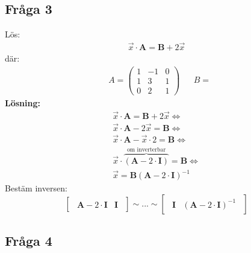 \subsection{Fråga 3}
Lös:
\begin{gather*}
    \vec{x} \cdot \mathbf{A} = \mathbf{B} + 2 \vec{x}
\end{gather*}
där:
\begin{align*}
&A =
\begin{pmatrix}
    1 & -1 & 0\\
    1 & 3 & 1\\
    0 & 2 & 1
\end{pmatrix}
&&B =
\end{align*}
\textbf{Lösning:}
\begin{gather*}
    \vec{x} \cdot \mathbf{A} = \mathbf{B} + 2 \vec{x} \Leftrightarrow\\
    \vec{x} \cdot \mathbf{A} - 2 \vec{x} = \mathbf{B} \Leftrightarrow\\
    \vec{x} \cdot \mathbf{A} - \vec{x} \cdot 2 = \mathbf{B} \Leftrightarrow\\
    \vec{x} \cdot \overbrace{(\mathbf{A} - 2 \cdot \mathbf{I})}^\text{om inverterbar} = \mathbf{B} \Leftrightarrow\\
    \vec{x} = \mathbf{B} (\mathbf{A} - 2 \cdot \mathbf{I})^{-1}
\end{gather*}
Bestäm inversen:
\[
    \begin{bmatrix}
    \begin{array}{c|c}
        \mathbf{A} - 2 \cdot \mathbf{I} & \mathbf{I}
    \end{array}
    \end{bmatrix}
    \sim ... \sim
    \begin{bmatrix}
    \begin{array}{c|c}
        \mathbf{I} & (\mathbf{A} - 2 \cdot \mathbf{I})^{-1}
    \end{array}
    \end{bmatrix}
\]
\subsection{Fråga 4}
